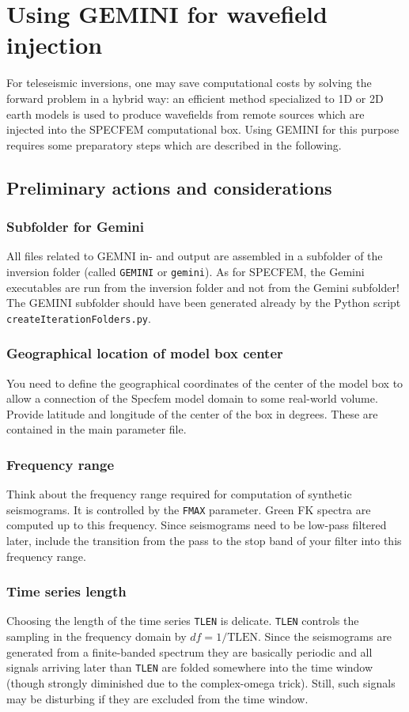 %
\section{Using GEMINI for wavefield injection}
%
For teleseismic inversions, one may save computational costs by solving the forward problem in a hybrid way: an efficient method specialized to 1D or 2D earth models is used to produce wavefields from remote sources which are injected into the SPECFEM computational box. Using GEMINI for this purpose requires some preparatory steps which are described in the following.
%
\subsection{Preliminary actions and considerations}
%
\subsubsection{Subfolder for Gemini}
 All files related to GEMNI in- and output are assembled in a subfolder of the inversion folder (called \verb+GEMINI+ or \verb+gemini+). As for SPECFEM, the Gemini executables are run from the inversion folder and not from the Gemini subfolder! The GEMINI subfolder should have been generated already by the Python script \verb+createIterationFolders.py+.
%
\subsubsection{Geographical location of model box center}
	You need to define the geographical coordinates of the center of the model box to allow a connection of the Specfem model domain to some real-world volume. Provide latitude and longitude of the center of the box in degrees. These are contained in the main parameter file.
%
\subsubsection{Frequency range}
	Think about the frequency range required for computation of synthetic seismograms. It is controlled by the \verb+FMAX+ parameter. Green FK spectra are computed up to this frequency. Since seismograms need to be low-pass filtered later, include the transition from the pass to the stop band of your filter into this frequency range.
%
\subsubsection{Time series length}
	Choosing the length of the time series \verb+TLEN+ is delicate. \verb+TLEN+ controls the sampling in the frequency domain by $df = 1/\mathrm{TLEN}$. Since the seismograms are generated from a finite-banded spectrum they are basically periodic and all signals arriving later than \verb+TLEN+ are folded somewhere into the time window (though strongly diminished due to the complex-omega trick). Still, such signals may be disturbing if they are excluded from the time window.
%
